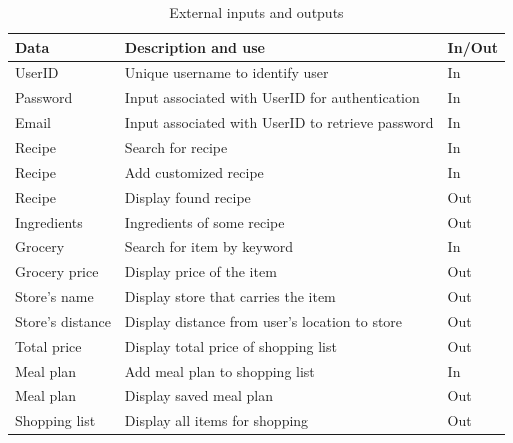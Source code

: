 \begin{table}[!h]
\centering
\begin{tabular}{|l|l|l|}
\hline
\textbf {Data}      & \textbf{Description and use}  & \textbf{In/Out} \\
\hline
UserID & Unique username to identify user & In     \\
\hline
Password & Input associated with UserID for authentication & In       \\
\hline
Email & Input associated with UserID to retrieve password & In      \\
\hline
Recipe & Search for recipe  & In       \\
\hline
Recipe & Add customized recipe  & In       \\
\hline
Recipe & Display found recipe  & Out       \\
\hline
Ingredients & Ingredients of some recipe & Out       \\
\hline
Grocery & Search for item by keyword  & In     \\
\hline
Grocery price & Display price of the item & Out          \\
\hline
Store's name & Display store that carries the item & Out       \\
\hline
Store's distance & Display distance from user's location to store & Out \\
\hline
Total price & Display total price of shopping list & Out \\
\hline
Meal plan &  Add meal plan to shopping list & In       \\
\hline
Meal plan &  Display saved meal plan  & Out       \\
\hline
Shopping list & Display all items for shopping & Out        \\
\hline
\end{tabular}
\caption{External inputs and outputs}
\end{table}


